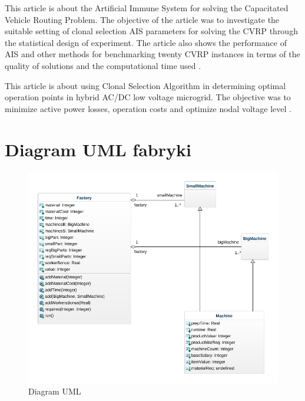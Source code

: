 \documentclass[a4paper]{article}
\begin{document}
This article is about the Artificial Immune System for solving the Capacitated Vehicle Routing Problem. The objective of the article was to investigate the suitable setting of clonal selection AIS parameters for solving the CVRP through the statistical design of experiment. The article also shows the performance of AIS and other methods for benchmarking twenty CVRP instances in terms of the quality of solutions and the computational time used \cite{thapatsuwan}.


This article is about using Clonal Selection Algorithm in determining optimal operation points in hybrid AC/DC low voltage microgrid. The objective was to minimize active power losses, operation costs and optimize nodal voltage level \cite{rokicki}.



\section{Diagram UML fabryki}
\begin{figure}[ht]
\centering
\includegraphics[width=.7\textwidth]{UML_Model.png}
\caption{Diagram UML}
\end{figure}

\newpage
\printbibliography
\end{document}
